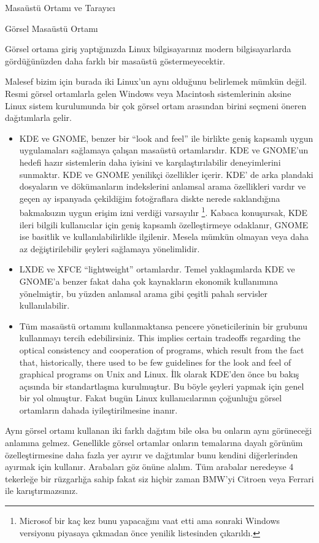 \begin{section}{Masaüstü Ortamı ve Tarayıcı}
\begin{subsection}{Görsel Masaüstü Ortamı}

Görsel ortama giriş yaptığınızda Linux bilgisayarınız modern bilgisayarlarda gördüğünüzden daha farklı bir masaüstü göstermeyecektir. 

Malesef bizim için burada iki Linux’un aynı olduğunu belirlemek mümkün değil. Resmi görsel ortamlarla gelen Windows veya Macintosh sistemlerinin aksine Linux sistem kurulumunda bir çok görsel ortam arasından birini seçmeni öneren dağıtımlarla gelir. 
\begin{itemize}
\item KDE ve GNOME, benzer bir “look and feel” ile birlikte geniş kapsamlı uygun uygulamaları sağlamaya çalışan masaüstü ortamlarıdır. KDE ve GNOME’un hedefi hazır sistemlerin daha iyisini ve karşılaştırılabilir deneyimlerini sunmaktır. KDE ve GNOME yenilikçi özellikler içerir. KDE’ de arka plandaki dosyaların ve dökümanların indekslerini anlamsal arama özellikleri vardır ve geçen ay ispanyada çekildiğim fotoğraflara diskte nerede saklandığına bakmaksızın uygun erişim izni verdiği varsayılır
\footnote{Microsof bir kaç kez bunu yapacağını vaat etti ama sonraki Windows versiyonu piyasaya çıkmadan önce yenilik listesinden çıkarıldı.}. Kabaca konuşursak, KDE ileri bilgili kullanıcılar için geniş kapsamlı özelleştirmeye odaklanır, GNOME ise basitlik ve kullanılabilirlikle ilgilenir. Mesela mümkün olmayan veya daha az değiştirilebilir şeyleri sağlamaya yönelimlidir. 
\item LXDE ve XFCE “lightweight” ortamlardır. Temel yaklaşımlarda KDE ve GNOME’a benzer fakat daha çok kaynakların ekonomik kullanımına yönelmiştir, bu yüzden anlamsal arama gibi çeşitli pahalı servisler kullanılabilir. 
\item Tüm masaüstü ortamını kullanmaktansa pencere yöneticilerinin bir grubunu kullanmayı tercih edebilirsiniz. This implies certain tradeoffs regarding the optical consistency and cooperation of programs, which result from the fact that, historically, there used to be few guidelines for the look and feel of graphical programs on Unix and Linux. İlk olarak KDE’den önce bu bakış açısında bir standartlaşma kurulmuştur. Bu böyle şeyleri yapmak için genel bir yol olmuştur. Fakat bugün Linux kullanıcılarının çoğunluğu görsel ortamların  dahada iyileştirilmesine inanır. 
\end{itemize}

Aynı görsel ortamı kullanan iki farklı dağıtım bile olsa bu onların aynı görüneceği anlamına gelmez. Genellikle görsel ortamlar onların temalarına dayalı görünüm özelleştirmesine daha fazla yer ayırır ve dağıtımlar bunu kendini diğerlerinden ayırmak için kullanır. Arabaları göz önüne alalım. Tüm arabalar neredeyse 4 tekerleğe bir rüzgarlığa sahip fakat siz hiçbir zaman BMW’yi Citroen veya Ferrari ile karıştırmazsınız. 


\end{subsection}
\end{section}
